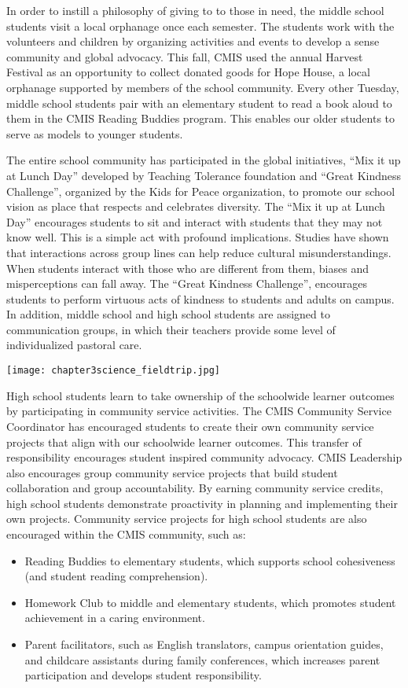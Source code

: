 In order to instill a philosophy of giving to to those in need, the middle school students visit a local orphanage once each semester.  The students work with the volunteers and children by organizing activities and events to develop a sense community and global advocacy.  This fall, CMIS used the annual Harvest Festival as an opportunity to collect donated goods for Hope House, a local orphanage supported by members of the school community.  Every other Tuesday, middle school students pair with an elementary student to read a book aloud to them in the CMIS Reading Buddies program.  This enables our older students to serve as models to younger students.  

The entire school community has participated in the global initiatives, “Mix it up at Lunch Day” developed by Teaching Tolerance foundation and “Great Kindness Challenge”, organized by the Kids for Peace organization, to promote our school vision as place that respects and celebrates diversity. The “Mix it up at Lunch Day” encourages students to sit and interact with students that they may not know well. This is a simple act with profound implications. Studies have shown that interactions across group lines can help reduce cultural misunderstandings. When students interact with those who are different from them, biases and misperceptions can fall away.  The “Great Kindness Challenge”, encourages students to perform virtuous acts of kindness to students and adults on campus. In addition, middle school and high school students are assigned to communication groups, in which their teachers provide some level of individualized pastoral care.  

{\centering\texttt{[image: chapter3science\_fieldtrip.jpg]}}

High school students learn to take ownership of the schoolwide learner outcomes by participating in community service activities. The CMIS Community Service Coordinator has encouraged students to create their own community service projects that align with our schoolwide learner outcomes. This transfer of responsibility encourages student inspired community advocacy.  CMIS Leadership also encourages group community service projects that build student collaboration and group accountability. By earning community service credits, high school students demonstrate proactivity in planning and implementing their own projects.  Community service projects for high school students are also encouraged within the CMIS community, such as: 
\begin{itemize}
\item Reading Buddies to elementary students, which supports school cohesiveness (and student reading comprehension). 
\item Homework Club to middle and elementary students, which promotes student achievement in a caring environment. 
\item Parent facilitators, such as English translators, campus orientation guides, and childcare assistants during family conferences, which increases parent participation and develops student responsibility.
\end{itemize}

